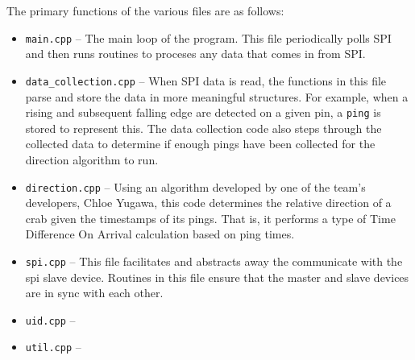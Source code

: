 \documentclass[12pt]{article}
\begin{document}
The primary functions of the various files are as follows:
\begin{itemize}
\item \texttt{main.cpp} --
	The main loop of the program. This file periodically polls SPI and
	then runs routines to proceses any data that comes in from SPI.
\item \texttt{data\_collection.cpp} --
	When SPI data is read, the functions in this file parse and store the
	data in more meaningful structures.
	For example, when a rising and subsequent falling edge are detected on a
	given pin, a \texttt{ping} is stored to represent this.
	The data collection code also steps through the collected data to determine
	if enough pings have been collected for the direction algorithm to run.
\item \texttt{direction.cpp} --
	Using an algorithm developed by one of the team's developers, Chloe Yugawa,
	this code determines the relative direction of a crab given the timestamps
	of its pings.
	That is, it performs a type of Time Difference On Arrival calculation
	based on ping times.
\item \texttt{spi.cpp} --
	This file facilitates and abstracts away the communicate with the
	\gls{spi} slave device.
	Routines in this file ensure that the master and slave devices are in
	sync with each other.
\item \texttt{uid.cpp} --
\item \texttt{util.cpp} --
\end{itemize}

\newpage

\printglossary
\end{document}
